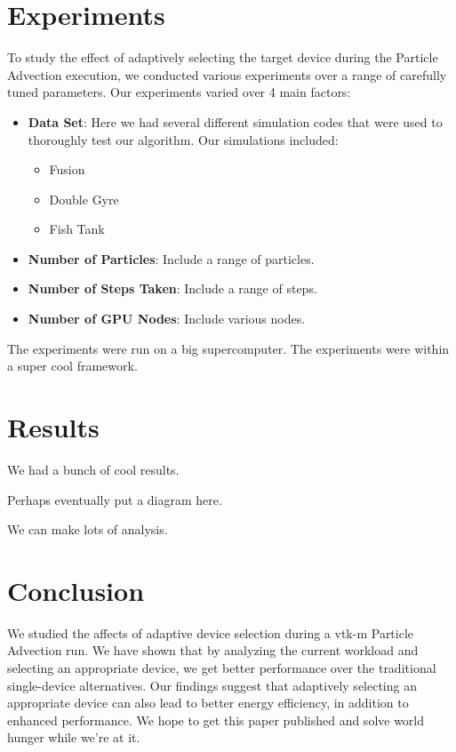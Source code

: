 \documentclass{IEEEtran}
\begin{document}
\section{Experiments}
To study the effect of adaptively selecting the target device during the Particle Advection execution, we conducted various experiments over a range of carefully tuned parameters.
%
Our experiments varied over 4 main factors:
%
\begin{itemize}
\item \textbf{Data Set}: Here we had several different simulation codes that were used to thoroughly test our algorithm. Our simulations included:
%
\begin{itemize}
\item{Fusion}
\item{Double Gyre}
\item{Fish Tank}
\end{itemize}
%
\item \textbf{Number of Particles}: Include a range of particles.
\item \textbf{Number of Steps Taken}: Include a range of steps.
\item \textbf{Number of GPU Nodes}: Include various nodes.
\end{itemize}
%
The experiments were run on a big supercomputer. 
%
The experiments were within a super cool framework.
%
\section{Results}
We had a bunch of cool results.
\begin{center}
 Perhaps eventually put a diagram here.
\end{center}
We can make lots of analysis.
%
\section{Conclusion}
We studied the affects of adaptive device selection during a vtk-m Particle Advection run. 
%
We have shown that by analyzing the current workload and selecting an appropriate device, we get better performance over the traditional single-device alternatives. 
%
Our findings suggest that adaptively selecting an appropriate device can also lead to better energy efficiency, in addition to enhanced performance. 
%
We hope to get this paper published and solve world hunger while we're at it.
%
\end{document}
